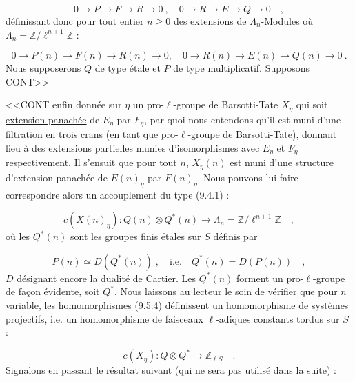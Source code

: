 \begin{equation}\tag{9.5.2}
0 \longrightarrow P \longrightarrow F \longrightarrow R \longrightarrow 0 \ , \quad 0 \longrightarrow R \longrightarrow E \longrightarrow Q \longrightarrow 0 \quad ,
\end{equation}
définissant donc pour tout entier $n \geq 0$ des extensions de $\Lambda_n$-Modules où $\Lambda_n = \mathbb{Z}/\ell^{n+1}\mathbb{Z}$ :

\begin{equation}\tag{9.5.3}
0 \longrightarrow P(n) \longrightarrow F(n) \longrightarrow R(n) \longrightarrow 0, \quad 0 \longrightarrow R(n) \longrightarrow E(n) \longrightarrow Q(n) \longrightarrow 0 \ .
\end{equation}
Nous supposerons $Q$ de type étale et $P$ de type multiplicatif. Supposons CONT>>



<<CONT enfin donnée sur $\eta$ un pro-$\ell$-groupe de Barsotti-Tate $X_\eta$ qui soit \underline{extension panachée} de $E_\eta$ par $F_\eta$, par quoi nous entendons qu'il est muni d'une filtration en trois crans (en tant que pro-$\ell$-groupe de Barsotti-Tate), donnant lieu à des extensions partielles munies d'isomorphismes avec $E_\eta$ et $F_\eta$ respectivement. Il s'ensuit que pour tout $n$, $X_\eta(n)$ est muni d'une structure d'extension panachée de $E(n)_\eta$ par $F(n)_\eta$. Nous pouvons lui faire correspondre alors un accouplement du type (9.4.1) :

\begin{equation}\tag{9.5.4}
c(X(n)_\eta) : Q(n) \otimes Q^*(n) \longrightarrow \Lambda_n = \mathbb{Z}/\ell^{n+1}\mathbb{Z} \quad ,
\end{equation}
où les $Q^*(n)$ sont les groupes finis étales sur $S$ définis par

\begin{equation*}
P(n) \simeq D(Q^*(n)) \; , \quad \mathrm{i.e.} \quad Q^*(n) = D(P(n)) \quad ,
\end{equation*}
$D$ désignant encore la dualité de Cartier. Les $Q^*(n)$ forment un pro-$\ell$-groupe de façon évidente, soit $Q^*$. Nous laissons au lecteur le soin de vérifier que pour $n$ variable, les homomorphismes (9.5.4) définissent un homomorphisme de systèmes projectifs, i.e. un homomorphisme de faisceaux $\ell$-adiques constants tordus sur $S$ :

\begin{equation}\tag{9.5.5}
c(X_\eta) : Q \otimes Q^* \longrightarrow \mathbb{Z}_{\ell S} \quad .
\end{equation}
Signalons en passant le résultat suivant (qui ne sera pas utilisé dans la suite) :

